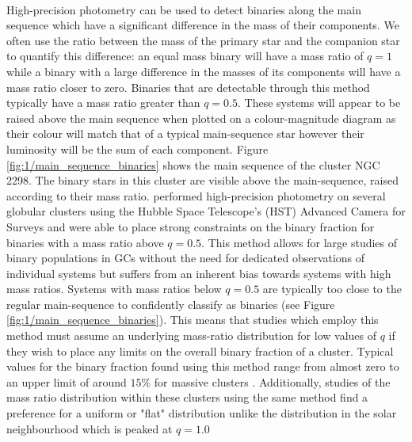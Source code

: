 \paragraph{}
High-precision photometry can be used to detect binaries along the main sequence which have a
significant difference in the mass of their components. We often use the ratio between the mass of
the primary star and the companion star to quantify this difference: an equal mass binary will have
a mass ratio of $q=1$ while a binary with a large difference in the masses of its components will
have a mass ratio closer to zero. Binaries that are detectable through this method typically have a
mass ratio greater than $q=0.5$. These systems will appear to be raised above the main sequence when
plotted on a colour-magnitude diagram as their colour will match that of a typical main-sequence
star however their luminosity will be the sum of each component. Figure
\ref{fig:1/main_sequence_binaries} shows the main sequence of the cluster NGC\,2298. The binary
stars in this cluster are visible above the main-sequence, raised according to their mass ratio.
\citet{Milone2012} performed high-precision photometry on several globular clusters using the Hubble
Space Telescope's (HST) Advanced Camera for Surveys and were able to place strong constraints on the
binary fraction for binaries with a mass ratio above $q=0.5$. This method allows for large studies
of binary populations in GCs without the need for dedicated observations of individual systems but
suffers from an inherent bias towards systems with high mass ratios. Systems with mass ratios below
$q=0.5$ are typically too close to the regular main-sequence to confidently classify as binaries
(see Figure \ref{fig:1/main_sequence_binaries}). This means that studies which employ this method
must assume an underlying mass-ratio distribution for low values of $q$ if they wish to place any
limits on the overall binary fraction of a cluster. Typical values for the binary fraction found
using this method range from almost zero to an upper limit of around $15\%$ for massive clusters
\citep{Milone2012}. Additionally, studies of the mass ratio distribution within these clusters using
the same method find a preference for a uniform or "flat" distribution unlike the distribution in
the solar neighbourhood which is peaked at $q=1.0$ \citep{Milone2012,Fisher2005}


